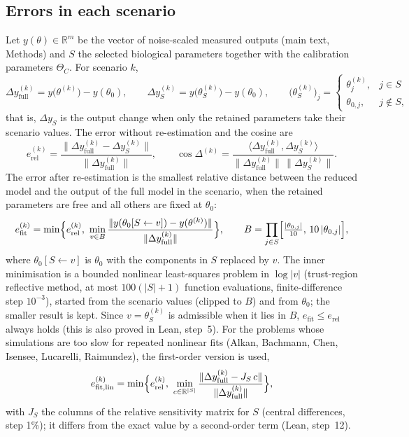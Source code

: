\subsection*{Errors in each scenario}
Let $y(\theta)\in\mathbb R^m$ be the vector of noise-scaled measured outputs (main text, Methods) and $S$ the selected biological parameters together with the calibration parameters $\Theta_C$. For scenario $k$,
\[ \Delta y^{(k)}_{\mathrm{full}}=y\bigl(\theta^{(k)}\bigr)-y(\theta_0),\qquad \Delta y^{(k)}_{S}=y\bigl(\theta^{(k)}_S\bigr)-y(\theta_0),\qquad \bigl(\theta^{(k)}_S\bigr)_j=\begin{cases}\theta^{(k)}_j,& j\in S\\ \theta_{0,j},& j\notin S,\end{cases} \]
that is, $\Delta y_S$ is the output change when only the retained parameters take their scenario values. The error without re-estimation and the cosine are
\[ e^{(k)}_{\mathrm{rel}}=\frac{\|\Delta y^{(k)}_{\mathrm{full}}-\Delta y^{(k)}_{S}\|}{\|\Delta y^{(k)}_{\mathrm{full}}\|},\qquad \cos\Delta^{(k)}=\frac{\langle\Delta y^{(k)}_{\mathrm{full}},\Delta y^{(k)}_{S}\rangle}{\|\Delta y^{(k)}_{\mathrm{full}}\|\,\|\Delta y^{(k)}_{S}\|}. \]
The error after re-estimation is the smallest relative distance between the reduced model and the output of the full model in the scenario, when the retained parameters are free and all others are fixed at $\theta_0$:
\[ e^{(k)}_{\mathrm{fit}}=\min\Bigl\{e^{(k)}_{\mathrm{rel}},\ \min_{v\in B}\frac{\|y(\theta_0[S\leftarrow v])-y(\theta^{(k)})\|}{\|\Delta y^{(k)}_{\mathrm{full}}\|}\Bigr\},\qquad B=\prod_{j\in S}\Bigl[\tfrac{|\theta_{0,j}|}{10},\,10\,|\theta_{0,j}|\Bigr], \]
where $\theta_0[S\leftarrow v]$ is $\theta_0$ with the components in $S$ replaced by $v$. The inner minimisation is a bounded nonlinear least-squares problem in $\log|v|$ (trust-region reflective method, at most $100(|S|+1)$ function evaluations, finite-difference step $10^{-3}$), started from the scenario values (clipped to $B$) and from $\theta_0$; the smaller result is kept. Since $v=\theta^{(k)}_S$ is admissible when it lies in $B$, $e_{\mathrm{fit}}\le e_{\mathrm{rel}}$ always holds (this is also proved in Lean, step~5). For the problems whose simulations are too slow for repeated nonlinear fits (Alkan, Bachmann, Chen, Isensee, Lucarelli, Raimundez), the first-order version is used,
\[ e^{(k)}_{\mathrm{fit,lin}}=\min\Bigl\{e^{(k)}_{\mathrm{rel}},\ \min_{c\in\mathbb R^{|S|}}\frac{\|\Delta y^{(k)}_{\mathrm{full}}-J_S\,c\|}{\|\Delta y^{(k)}_{\mathrm{full}}\|}\Bigr\}, \]
with $J_S$ the columns of the relative sensitivity matrix for $S$ (central differences, step 1\%); it differs from the exact value by a second-order term (Lean, step~12).
